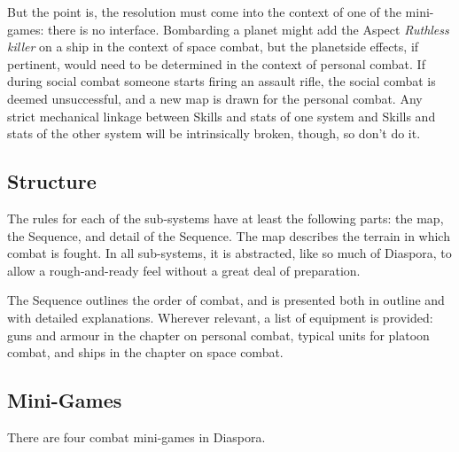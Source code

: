 But the point is, the resolution must come into the context of one of the mini-games: there is no interface. Bombarding a planet might add the Aspect \emph{Ruthless killer} on a ship in the context of space combat, but the planetside effects, if pertinent, would need to be determined in the context of personal combat. If during social combat someone starts firing an assault rifle, the social combat is deemed unsuccessful, and a new map is drawn for the personal combat. Any strict mechanical linkage between Skills and stats of one system and Skills and stats of the other system will be intrinsically broken, though, so don't do it.


\subsection{Structure}\label{sec:Structure} %

The rules for each of the sub-systems have at least the following parts: the map, the Sequence, and detail of the Sequence. The map describes the terrain in which combat is fought. In all sub-systems, it is abstracted, like so much of Diaspora, to allow a rough-and-ready feel without a great deal of preparation.

The Sequence outlines the order of combat, and is presented both in outline and with detailed explanations. Wherever relevant, a list of equipment is provided: guns and armour in the chapter on personal combat, typical units for platoon combat, and ships in the chapter on space combat.


\subsection{Mini-Games}\label{sec:Mini-Games} %

There are four combat mini-games in Diaspora.

